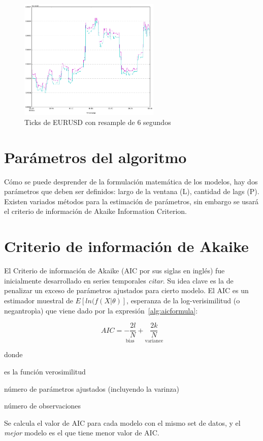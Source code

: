 \begin{figure}[h!t]
    \begin{center}
        \includegraphics[width=0.6\textwidth]{images/eurusd_6s}
        \caption{Ticks de EURUSD con resample de 6 segundos}
        \label{fig:eurusd_r6s}
    \end{center}
\end{figure}

\section{Parámetros del algoritmo}
Cómo se puede desprender de la formulación matemática de los modelos, hay dos
parámetros que deben ser definidos: largo de la ventana (L), cantidad de lags
(P). Existen variados métodos para la estimación de parámetros, sin embargo se
usará el criterio de información de Akaike Information Criterion.

\section{Criterio de información de Akaike}
El Criterio de información de Akaike (AIC por sus siglas en inglés) fue
inicialmente desarrollado en series temporales \emph{citar}. Su idea clave es
la de penalizar un exceso de parámetros ajustados para cierto modelo. El AIC es
un estimador muestral de $E[ln(f(X|\theta)]$, esperanza de la log-verisimilitud
(o negantropìa) que viene dado por la expresión~\ref{alg:aicformula}:

\begin{equation}
\label{eq:aicformula}
AIC = \underset{\text{bias}}{-\frac{2l}{N}} + 
\underset{\text{variance}}{\frac{2k}{N}}
\end{equation}

\noindent donde

\begin{description}
\item[l] es la función verosimilitud
\item[k] número de parámetros ajustados (incluyendo la varinza)
\item[N] número de observaciones
\item Se calcula el valor de AIC para cada modelo con el mismo set de datos, y
el \emph{mejor} modelo es el que tiene menor valor de AIC.
\end{description}

